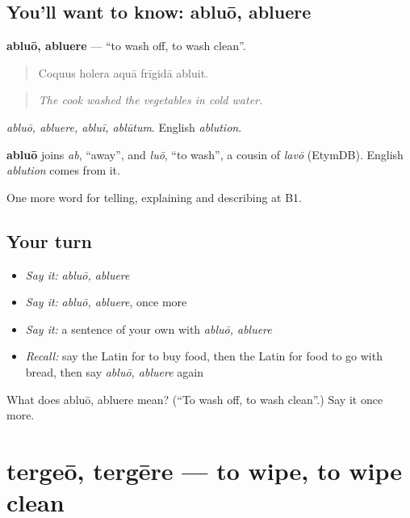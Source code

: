 \subsection*{You'll want to know: abluō, abluere}
\textbf{abluō, abluere} — \textquotedblleft{}to wash off, to wash clean\textquotedblright{}.

\begin{quote}
Coquus holera aquā frīgidā abluit.
\end{quote}

\begin{quote}
\emph{The cook washed the vegetables in cold water.}
\end{quote}

\emph{abluō, abluere, abluī, ablūtum}. English \emph{ablution}.

\begin{cousinweb}
\textbf{abluō} joins \emph{ab}, \textquotedblleft{}away\textquotedblright{}, and \emph{luō}, \textquotedblleft{}to wash\textquotedblright{}, a cousin of \emph{lavō} (EtymDB). English \emph{ablution} comes from it.
\end{cousinweb}

\begin{grammarlens}[title={What you've built}]
One more word for telling, explaining and describing at B1.
\end{grammarlens}

\subsection*{Your turn}
\begin{itemize}
\raggedright
  \item \emph{Say it:} \emph{abluō, abluere}
  \item \emph{Say it:} \emph{abluō, abluere}, once more
  \item \emph{Say it:} a sentence of your own with \emph{abluō, abluere}
  \item \emph{Recall:} say the Latin for to buy food, then the Latin for food to go with bread, then say \emph{abluō, abluere} again
\end{itemize}

\begin{tcolorbox}[breakable,colback=teal!4,colframe=teal!35!black,title={Before you move on}]
What does abluō, abluere mean? (\textquotedblleft{}To wash off, to wash clean\textquotedblright{}.) Say it once more.
\end{tcolorbox}
\section[tergeō, tergēre]{tergeō, tergēre — to wipe, to wipe clean}

